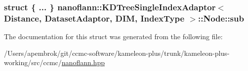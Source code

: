 \hypertarget{structnanoflann_1_1_k_d_tree_single_index_adaptor_1_1_node_a0f18e3c2f42717cce686aeb378f77a21}{
\subsubsection[{sub}]{\setlength{\rightskip}{0pt plus 5cm}struct \{ ... \}   {\bf nanoflann\-::\-K\-D\-Tree\-Single\-Index\-Adaptor}$<$ Distance, Dataset\-Adaptor, D\-I\-M, Index\-Type $>$\-::Node\-::sub}}\label{structnanoflann_1_1_k_d_tree_single_index_adaptor_1_1_node_a0f18e3c2f42717cce686aeb378f77a21}


The documentation for this struct was generated from the following file\-:\begin{DoxyCompactItemize}
\item 
/\-Users/apembrok/git/ccmc-\/software/kameleon-\/plus/trunk/kameleon-\/plus-\/working/src/ccmc/\hyperlink{nanoflann_8hpp}{nanoflann.\-hpp}\end{DoxyCompactItemize}
